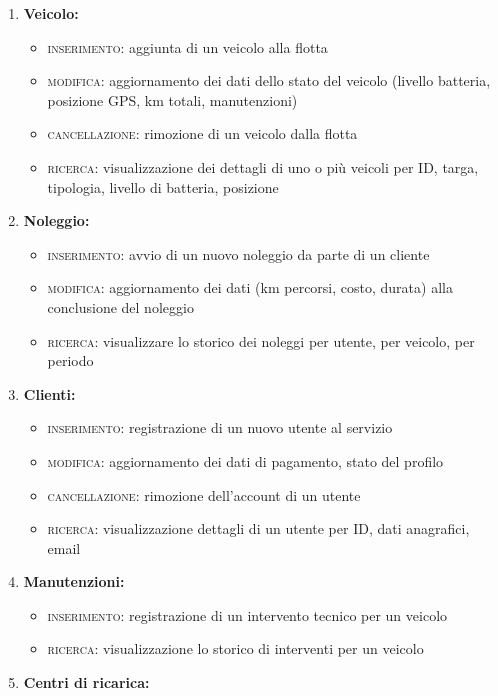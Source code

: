 \documentclass{article}
\begin{document}
\begin{enumerate}
    \item \textbf{Veicolo:} 
    \begin{itemize}
        \item \textsc{inserimento:} aggiunta di un veicolo alla flotta
        \item \textsc{modifica:} aggiornamento dei dati dello stato del veicolo (livello batteria, posizione GPS, km totali, manutenzioni) 
        \item \textsc{cancellazione:} rimozione di un veicolo dalla flotta
        \item \textsc{ricerca:} visualizzazione dei dettagli di uno o più veicoli per ID, targa, tipologia, livello di batteria, posizione
    \end{itemize}
    \item \textbf{Noleggio:}
    \begin{itemize}
        \item \textsc{inserimento:} avvio di un nuovo noleggio da parte di un cliente
        \item \textsc{modifica:} aggiornamento dei dati (km percorsi, costo, durata) alla conclusione del noleggio
        \item \textsc{ricerca:} visualizzare lo storico dei noleggi per utente, per veicolo, per periodo
    \end{itemize}
    \item \textbf{Clienti:}
    \begin{itemize}
        \item \textsc{inserimento:} registrazione di un nuovo utente al servizio
        \item \textsc{modifica:} aggiornamento dei dati di pagamento, stato del profilo
        \item \textsc{cancellazione:} rimozione dell'account di un utente
        \item \textsc{ricerca:} visualizzazione dettagli di un utente per ID, dati anagrafici, email
    \end{itemize}
    \item \textbf{Manutenzioni:}
    \begin{itemize}
        \item \textsc{inserimento:} registrazione di un intervento tecnico per un veicolo
        \item \textsc{ricerca:} visualizzazione lo storico di interventi per un veicolo
    \end{itemize}
    \item \textbf{Centri di ricarica:}

\end{enumerate}
\end{document}
